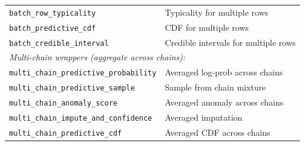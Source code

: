 \documentclass[11pt]{article}
\begin{document}
\begin{table}[!htb]
\begin{tabular}{lp{7cm}}
\texttt{batch\_row\_typicality} & Typicality for multiple rows \\
\texttt{batch\_predictive\_cdf} & CDF for multiple rows \\
\texttt{batch\_credible\_interval} & Credible intervals for multiple rows \\
\midrule
\multicolumn{2}{l}{\textit{Multi-chain wrappers (aggregate across chains):}} \\
\texttt{multi\_chain\_predictive\_probability} & Averaged log-prob across chains \\
\texttt{multi\_chain\_predictive\_sample} & Sample from chain mixture \\
\texttt{multi\_chain\_anomaly\_score} & Averaged anomaly across chains \\
\texttt{multi\_chain\_impute\_and\_confidence} & Averaged imputation \\
\texttt{multi\_chain\_predictive\_cdf} & Averaged CDF across chains \\
\bottomrule
\end{tabular}
\end{table}
\end{document}
